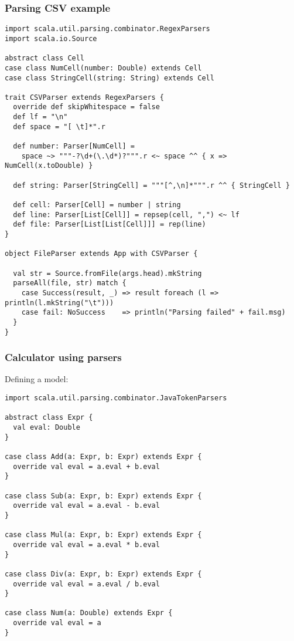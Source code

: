 \documentclass{beamer}
\begin{document}
\begin{frame}[fragile]
\frametitle{Parsing CSV example}
\begin{lstlisting}
import scala.util.parsing.combinator.RegexParsers
import scala.io.Source

abstract class Cell
case class NumCell(number: Double) extends Cell
case class StringCell(string: String) extends Cell

trait CSVParser extends RegexParsers {
  override def skipWhitespace = false
  def lf = "\n"
  def space = "[ \t]*".r

  def number: Parser[NumCell] = 
    space ~> """-?\d+(\.\d*)?""".r <~ space ^^ { x => NumCell(x.toDouble) }
  
  def string: Parser[StringCell] = """[^,\n]*""".r ^^ { StringCell }

  def cell: Parser[Cell] = number | string
  def line: Parser[List[Cell]] = repsep(cell, ",") <~ lf
  def file: Parser[List[List[Cell]]] = rep(line)
}

object FileParser extends App with CSVParser {

  val str = Source.fromFile(args.head).mkString
  parseAll(file, str) match {
    case Success(result, _) => result foreach (l => println(l.mkString("\t")))
    case fail: NoSuccess    => println("Parsing failed" + fail.msg)
  }
}
\end{lstlisting}
\end{frame}

\begin{frame}[fragile]
\frametitle{Calculator using parsers}
Defining a model:
\begin{lstlisting}[name=calc]
import scala.util.parsing.combinator.JavaTokenParsers

abstract class Expr {
  val eval: Double
}

case class Add(a: Expr, b: Expr) extends Expr {
  override val eval = a.eval + b.eval
}

case class Sub(a: Expr, b: Expr) extends Expr {
  override val eval = a.eval - b.eval
}

case class Mul(a: Expr, b: Expr) extends Expr {
  override val eval = a.eval * b.eval
}

case class Div(a: Expr, b: Expr) extends Expr {
  override val eval = a.eval / b.eval
}

case class Num(a: Double) extends Expr {
  override val eval = a
}
\end{lstlisting}
\end{frame}
\end{document}
